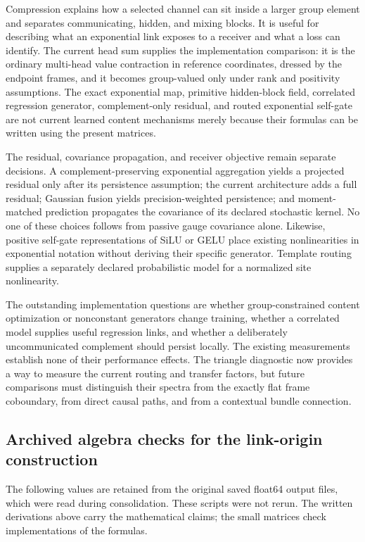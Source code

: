 \documentclass[11pt]{article}
\theoremstyle{definition}
\theoremstyle{remark}
\begin{document}
Compression explains how a selected channel can sit inside a larger group element and separates communicating, hidden, and mixing blocks. It is useful for describing what an exponential link exposes to a receiver and what a loss can identify. The current head sum supplies the implementation comparison: it is the ordinary multi-head value contraction in reference coordinates, dressed by the endpoint frames, and it becomes group-valued only under rank and positivity assumptions. The exact exponential map, primitive hidden-block field, correlated regression generator, complement-only residual, and routed exponential self-gate are not current learned content mechanisms merely because their formulas can be written using the present matrices.

The residual, covariance propagation, and receiver objective remain separate decisions. A complement-preserving exponential aggregation yields a projected residual only after its persistence assumption; the current architecture adds a full residual; Gaussian fusion yields precision-weighted persistence; and moment-matched prediction propagates the covariance of its declared stochastic kernel. No one of these choices follows from passive gauge covariance alone. Likewise, positive self-gate representations of SiLU or GELU place existing nonlinearities in exponential notation without deriving their specific generator. Template routing supplies a separately declared probabilistic model for a normalized site nonlinearity.

The outstanding implementation questions are whether group-constrained content optimization or nonconstant generators change training, whether a correlated model supplies useful regression links, and whether a deliberately uncommunicated complement should persist locally. The existing measurements establish none of their performance effects. The triangle diagnostic now provides a way to measure the current routing and transfer factors, but future comparisons must distinguish their spectra from the exactly flat frame coboundary, from direct causal paths, and from a contextual bundle connection.

\subsection{Archived algebra checks for the link-origin construction}
\label{links:origin:sec:checks}

The following values are retained from the original saved float64 output files, which were read during consolidation. These scripts were not rerun. The written derivations above carry the mathematical claims; the small matrices check implementations of the formulas.
\end{document}
